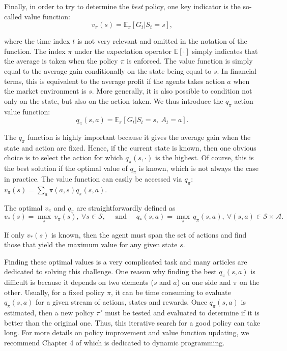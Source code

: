 \documentclass[]{krantz}
\theoremstyle{definition}
\theoremstyle{definition}
\theoremstyle{definition}
\theoremstyle{remark}
\begin{document}
Finally, in order to try to determine the \emph{best} policy, one key
indicator is the so-called value function: \begin{equation}
\label{eq:RLvalue}
v_\pi(s)=\mathbb{E}_\pi\left[ G_t | S_t=s \right],
\end{equation}

where the time index \(t\) is not very relevant and omitted in the
notation of the function. The index \(\pi\) under the expectation
operator \(\mathbb{E}[\cdot]\) simply indicates that the average is
taken when the policy \(\pi\) is enforced. The value function is simply
equal to the average gain conditionally on the state being equal to
\(s\). In financial terms, this is equivalent to the average profit if
the agents takes action \(a\) when the market environment is \(s\). More
generally, it is also possible to condition not only on the state, but
also on the action taken. We thus introduce the \(q_\pi\) action-value
function: \begin{equation}
\label{eq:RLQ}
q_\pi(s,a)=\mathbb{E}_\pi\left[ G_t | S_t=s, \ A_t=a \right].
\end{equation}

The \(q_\pi\) function is highly important because it gives the average
gain when the state and action are fixed. Hence, if the current state is
known, then one obvious choice is to select the action for which
\(q_\pi(s,\cdot)\) is the highest. Of course, this is the best solution
if the optimal value of \(q_\pi\) is known, which is not always the case
in practice. The value function can easily be accessed via \(q_\pi\):
\(v_\pi(s)=\sum_a \pi(a,s)q_\pi(s,a)\).

The optimal \(v_\pi\) and \(q_\pi\) are straightforwardly defined as
\[v_*(s)=\underset{\pi}{\max} \, v_\pi(s), \ \forall s\in \mathcal{S}, \quad \text{ and } \quad q_*(s,a) =\underset{\pi}{\max} \, q_\pi(s,a), \ \forall (s,a)\in \mathcal{S}\times \mathcal{A}.\]

If only \(v_*(s)\) is known, then the agent must span the set of actions
and find those that yield the maximum value for any given state \(s\).

Finding these optimal values is a very complicated task and many
articles are dedicated to solving this challenge. One reason why finding
the best \(q_\pi(s,a)\) is difficult is because it depends on two
elements (\(s\) and \(a\)) on one side and \(\pi\) on the other.
Usually, for a fixed policy \(\pi\), it can be time consuming to
evaluate \(q_\pi(s,a)\) for a given stream of actions, states and
rewards. Once \(q_\pi(s,a)\) is estimated, then a new policy \(\pi'\)
must be tested and evaluated to determine if it is better than the
original one. Thus, this iterative search for a good policy can take
long. For more details on policy improvement and value function
updating, we recommend Chapter 4 of \citet{sutton2018reinforcement}
which is dedicated to dynamic programming.
\end{document}

